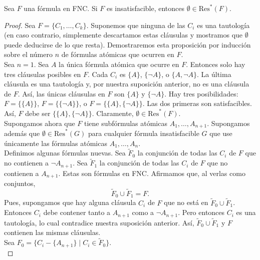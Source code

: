 \message{ !name(main.tex)}\documentclass[12pt,a4paper]{book}
\begin{document}
    \begin{proposicion}\label{prop:insatisfacible-implica-vacio}
        Sea $F$ una fórmula en FNC. Si $F$ es insatisfacible, entonces $\emptyset\in\mathrm{Res}^{*}(F)$.
    \end{proposicion}
    \begin{proof}
        Sea $F=\{C_{1},\dots,C_{k}\}$. Suponemos que ninguna de las $C_{i}$ es una tautología (en caso contrario,
        simplemente descartamos estas cláusulas y mostramos que $\emptyset$ puede deducirse de lo que resta). Demostraremos
        esta proposición por inducción sobre el número $n$ de fórmulas atómicas que ocurren en $F$.\\
        Sea $n=1$. Sea $A$ la única fórmula atómica que ocurre en $F$. Entonces solo hay tres cláusulas posibles en $F$. Cada
        $C_{i}$ es $\{A\}$, $\{\neg A\}$, o $\{A,\neg A\}$. La última cláusula es una tautología y, por nuestra suposición
        anterior, no es una cláusula de $F$. Así, las únicas cláusulas en $F$ son $\{A\}$ y $\{\neg A\}$. Hay tres
        posibilidades: $F=\{\{A\}\}$, $F=\{\{\neg A\}\}$, o $F=\{\{A\},\{\neg A\}\}$. Las dos primeras son satisfacibles. Así,
        $F$ debe ser $\{\{A\},\{\neg A\}\}$. Claramente, $\emptyset\in\mathrm{Res}^{*}(F)$.\\
        Supongamos ahora que $F$ tiene subfórmulas atómicas $A_{1},\dots,A_{n+1}$. Supongamos además que
        $\emptyset\in\mathrm{Res}^{*}(G)$ para cualquier fórmula insatisfacible $G$ que use únicamente las fórmulas atómicas
        $A_{1},\dots,A_{n}$.\\
        Definimos algunas fórmulas nuevas. Sea $\widetilde{F}_{0}$ la conjunción de todas las $C_{i}$ de $F$ que no
        contienen a $\neg A_{n+1}$. Sea $\widetilde{F}_{1}$ la conjunción de todas las $C_{i}$ de $F$ que no contienen a
        $A_{n+1}$. Estas son fórmulas en FNC. Afirmamos que, al verlas como conjuntos,
        \begin{equation*}
            \widetilde{F}_{0}\cup\widetilde{F}_{1}=F.
        \end{equation*}
        Pues, supongamos que hay alguna cláusula $C_{i}$ de $F$ que no está en $\widetilde{F}_{0}\cup\widetilde{F}_{1}$.
        Entonces $C_{i}$ debe contener tanto a $A_{n+1}$ como a $\neg A_{n+1}$. Pero entonces $C_{i}$ es una tautología, lo
        cual contradice nuestra suposición anterior. Así, $\widetilde{F}_{0}\cup\widetilde{F}_{1}$ y $F$ contienen las mismas
        cláusulas.\\
        Sea $F_{0}=\{C_{i}-\{A_{n+1}\}\mid C_{i}\in\widetilde{F}_{0}\}$.\\

\end{proof}
\end{document}
